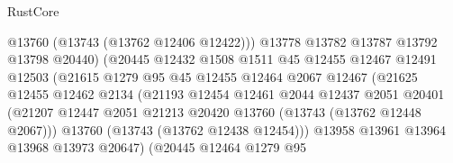 \begin{lexlean}{RustCore}
\begin{coremodule}
                                      @13760
                                      (@13743 (@13762 @12406 @12422)))
                                    @13778
                                    @13782
                                    @13787
                                    @13792
                                    @13798
                                    @20440)
                                  (@20445
                                    @12432
                                    @1508
                                    @1511
                                    @45
                                    @12455
                                    @12467
                                    @12491
                                    @12503
                                    (@21615
                                      @1279
                                      @95
                                      @45
                                      @12455
                                      @12464
                                      @2067
                                      @12467
                                      (@21625
                                        @12455
                                        @12462
                                        @2134
                                        (@21193
                                          @12454
                                          @12461
                                          @2044
                                          @12437
                                          @2051
                                          @20401
                                          (@21207
                                            @12447
                                            @2051
                                            @21213
                                            @20420
                                            @13760
                                            (@13743 (@13762 @12448 @2067)))
                                          @13760
                                          (@13743 (@13762 @12438 @12454)))
                                        @13958
                                        @13961
                                        @13964
                                        @13968
                                        @13973
                                        @20647)
                                      (@20445
                                        @12464
                                        @1279
                                        @95

\end{coremodule}
\end{lexlean}
